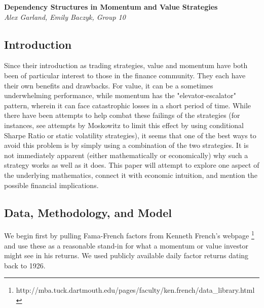 \documentclass[11pt,letterpaper]{memoir}
\begin{document}
    \vspace*{-50pt}
    \begin{center}
    	\textbf{{\large Dependency Structures in Momentum and Value Strategies}}
    	\\
    	\textit{Alex Garland, Emily Baczyk, Group 10}
    \end{center}
    
\subsection*{Introduction}
Since their introduction as trading strategies, value and momentum have both been of particular interest to those in the finance community. They each have their own benefits and drawbacks. For value, it can be a sometimes underwhelming performance, while momentum has the "elevator-escalator" pattern, wherein it can face catastrophic losses in a short period of time. While there have been attempts to help combat these failings of the strategies (for instances, see attempts by Moskowitz to limit this effect by using conditional Sharpe Ratio or static volatility strategies), it seems that one of the best ways to avoid this problem is by simply using a combination of the two strategies. It is not immediately apparent (either mathematically or economically) why such a strategy works as well as it does. This paper will attempt to explore one aspect of the underlying mathematics, connect it with economic intuition, and mention the possible financial implications.

\subsection*{Data, Methodology, and Model}
We begin first by pulling Fama-French factors from Kenneth French's webpage \footnote{http://mba.tuck.dartmouth.edu/pages/faculty/ken.french/data\_library.html} and use these as a reasonable stand-in for what a momentum or value investor might see in his returns. We used publicly available daily factor returns dating back to 1926.
\end{document}
